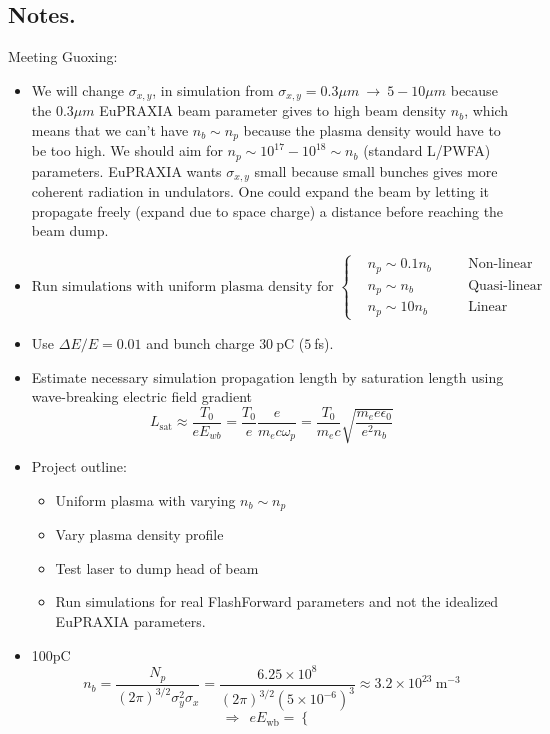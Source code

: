 \documentclass[%
onecolumn, notitlepage,
 amsmath,amssymb,
 aps,
]{article}
\begin{document}
\clearpage
\subsection*{Notes.}
Meeting Guoxing:
\begin{itemize}
\item We will change $\sigma_{x,y}$, in simulation from $\sigma_{x,y}=0.3 \mu m ~\to~5-10 \mu m$ because the $0.3\mu m$ EuPRAXIA beam parameter gives to high beam density $n_b$, which means that we can't have $n_b\sim n_p$ because the plasma density would have to be too high. We should aim for $n_p\sim 10^{17}-10^{18}\sim n_b$ (standard L/PWFA) parameters. 
EuPRAXIA wants $\sigma_{x,y}$ small because small bunches gives more coherent radiation in undulators. One could expand the beam by letting it propagate freely (expand due to space charge) a distance before reaching the beam dump. 
\item $\text{Run simulations with uniform plasma density for }\left\{\begin{aligned}
&n_p\sim 0.1 n_b \quad &&\text{Non-linear}\\
&n_p\sim  n_b\quad &&\text{Quasi-linear}\\
&n_p\sim 10 n_b\quad &&\text{Linear}
\end{aligned}\right.$ \\
\item Use $\Delta E/E=0.01$ and bunch charge $30~$pC ($5~$fs).\\
\item Estimate necessary simulation propagation length by saturation length using wave-breaking electric field gradient 
$$L_{\text{sat}}\approx \frac{T_0}{eE_{wb}}=\frac{T_0}{e}\frac{e}{m_e c\omega_p}=\frac{T_0}{m_e c}\sqrt{\frac{m_e e\epsilon_0}{e^2n_b}} $$ 
\item Project outline:
\begin{itemize}
\item Uniform plasma with varying $n_b\sim n_p$
\item Vary plasma density profile
\item Test laser to dump head of beam
\item Run simulations for real FlashForward parameters and not the idealized EuPRAXIA parameters.
\end{itemize}
\item  100pC $$n_b=\frac{N_p}{(2\pi)^{3/2} \sigma_y^2\sigma_x}=\frac{6.25\times 10^{8}}{(2\pi)^{3/2} (5\times 10^{-6})^3}\approx 3.2\times 10^{23}~ \text{m}^{-3} $$
$$\Rightarrow ~~eE_{\text{wb}}=\left\{\begin{aligned}

\end{aligned}$$
\end{itemize}
\end{document}
